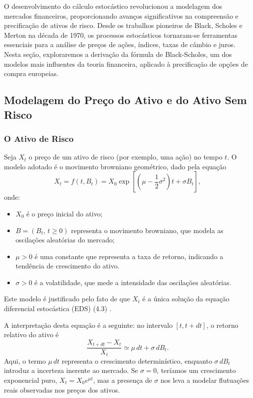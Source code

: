 \documentclass[12pt,openright,oneside,a4paper]{abntex2}
\numberwithin{equation}{section}
\begin{document}
O desenvolvimento do cálculo estocástico revolucionou a modelagem dos mercados financeiros, proporcionando avanços significativos na compreensão e precificação de ativos de risco. Desde os trabalhos pioneiros de Black, Scholes e Merton na década de 1970, os processos estocásticos tornaram-se ferramentas essenciais para a análise de preços de ações, índices, taxas de câmbio e juros. Nesta seção, exploraremos a derivação da fórmula de Black-Scholes, um dos modelos mais influentes da teoria financeira, aplicado à precificação de opções de compra europeias.
\subsection{Modelagem do Preço do Ativo e do Ativo Sem Risco}

\subsubsection{O Ativo de Risco}

Seja $X_t$ o preço de um ativo de risco (por exemplo, uma ação) no tempo $t$. O modelo adotado é o movimento browniano geométrico, dado pela equação
\begin{equation}
X_t = f (t, B_t) = X_0 \exp \left[ \left( \mu - \frac{1}{2} \sigma^2 \right) t + \sigma B_t \right],
\label{eq:mbg}
\end{equation}
onde:
\begin{itemize}
    \item $X_0$ é o preço inicial do ativo;
    \item $B=(B_t,\, t\ge 0)$ representa o movimento browniano, que modela as oscilações aleatórias do mercado;
    \item $\mu
 > 0$ é uma constante que representa a taxa de retorno, indicando a tendência de crescimento do ativo.
    \item $\sigma>0$ é a volatilidade, que mede a intensidade das oscilações aleatórias.
\end{itemize}

Este modelo é justificado pelo fato de que $X_t$ é a única solução da equação diferencial estocástica (EDS) (4.3) \parencite [p.~168] {Mikosh}. 


A interpretação desta equação é a seguinte: no intervalo $[t, t+dt]$, o retorno relativo do ativo é
\begin{equation}
    \frac{X_{t+dt} - X_t}{X_t} \simeq\mu \, dt + \sigma \, dB_t. 
\end{equation}
Aqui, o termo $\mu\, dt$ representa o crescimento determinístico, enquanto $\sigma \, dB_t$ introduz a incerteza inerente ao mercado. Se $\sigma=0$, teríamos um crescimento exponencial puro, $X_t = X_0 e^{\mu t}
$, mas a presença de $\sigma$ nos leva a modelar flutuações reais observadas nos preços dos ativos.
\end{document}
